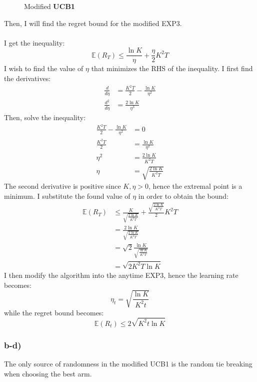 \documentclass[a4paper]{article}
\newcommand{\expect}[1]{\mathbb{E}\left(#1\right)}
\begin{document}
\begin{figure}[ht]
\begin{algorithm}[H]
 \caption{Modified \textbf{UCB1}}
 \label{algo2}
 \DontPrintSemicolon
\end{algorithm}
\end{figure}
Then, I will find the regret bound for the modified EXP3.\\\\
I get the inequality:
\[
\expect{R_T} \leq \frac{\ln{K}}{\eta} + \frac{\eta}{2}K^2T
\]
I wish to find the value of $\eta$ that minimizes the RHS of the inequality.
I first find the derivatives:
\begin{align*}
  \frac{d}{d\eta} &= \frac{K^2T}{2} - \frac{\ln{K}}{\eta^2}\\
  \frac{d^2}{d\eta} &= \frac{2\ln{K}}{\eta^3}
\end{align*}
Then, solve the inequality:
\begin{align*}
  \frac{K^2T}{2} - \frac{\ln{K}}{\eta^2} &= 0\\
  \frac{K^2T}{2} &= \frac{\ln{K}}{\eta^2}\\
  \eta^2 &= \frac{2\ln{K}}{K^2T}\\
  \eta &= \sqrt{\frac{2\ln{K}}{K^2T}}
\end{align*}
The second derivative is positive since $K, \eta > 0$, hence the extremal point
is a minimum. I substitute the found value of $\eta$ in order to obtain the
bound:
\begin{align*}
  \expect{R_T} &\leq 
  \frac{K}{\sqrt{\frac{2\ln{K}}{K^2T}}} +
  \frac{\sqrt{\frac{2\ln{K}}{K^2T}}}{2} K^2T \\
  &= \frac{2\ln{K}}{\sqrt{\frac{2\ln{K}}{K^2T}}}\\
  &= \sqrt{2}\frac{\ln{K}}{\sqrt{\frac{\ln{K}}{K^2T}}}\\
  &= \sqrt{2 K^2 T \ln{K}}
\end{align*}
I then modify the algorithm into the anytime EXP3, hence the learning rate
becomes:
\[
  \eta_t = \sqrt{\frac{\ln{K}}{K^2t}}
\]
while the regret bound becomes:
\[
  \expect{R_t} \leq 2\sqrt{K^2 t \ln{K}}
\]

\subsubsection*{b-d)}
The only source of randomness in the modified UCB1 is the random tie breaking
when choosing the best arm.
\end{document}
